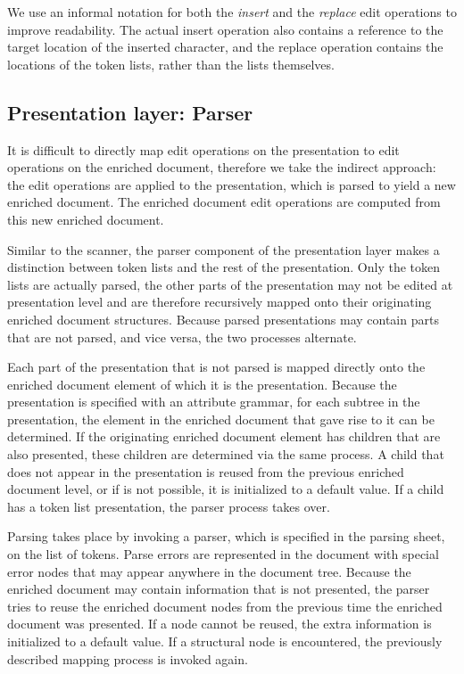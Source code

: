 We use an informal notation for both the {\em insert} and the {\em replace} edit operations to improve readability. The actual insert operation also contains a reference to the target location of the inserted character, and the replace operation contains the locations of the token lists, rather than the lists themselves. 


%																
\subsection{Presentation layer: Parser} \label{sect:parser}
        
It is difficult to directly map edit operations on the presentation to edit operations on the enriched document, therefore we take the indirect approach: the edit operations are applied to the presentation, which is parsed to yield a new enriched document. The enriched document edit operations are computed from this new enriched document.

Similar to the scanner, the parser component of the presentation layer makes a distinction between token lists and the rest of the presentation. Only the token lists are actually parsed, the other parts of the presentation may not be edited at presentation level and are therefore recursively mapped onto their originating enriched document structures. Because parsed presentations may contain parts that are not parsed, and vice versa, the two processes alternate.

Each part of the presentation that is not parsed is mapped directly onto the enriched document element of which it is the presentation. Because the presentation is specified with an attribute grammar, for each subtree in the presentation, the element in the enriched document that gave rise to it can be determined. If the originating enriched document element has children that are also presented, these children are determined via the same process. A child that does not appear in the presentation is reused from the previous enriched document level, or if is not possible, it is initialized to a default value. If a child has a token list presentation, the parser process takes over.

Parsing takes place by invoking a parser, which is specified in the parsing sheet, on the list of tokens. Parse errors are represented in the document with special error nodes that may appear anywhere in the document tree. Because the enriched document may contain information that is not presented, the parser tries to reuse the enriched document nodes from the previous time the enriched document was presented. If a node cannot be reused, the extra information is initialized to a default value. If a structural node is encountered, the previously described mapping process is invoked again.

